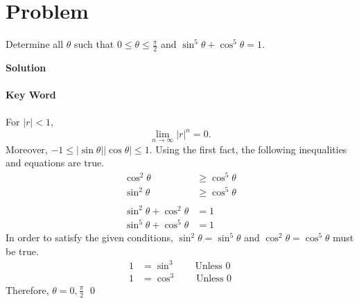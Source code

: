 \documentclass{article}
\newenvironment{solution}{\begin{trivlist}\item[]{\bf Solution}}{\qed \end{trivlist}}
\begin{document}
\newpage
\section*{Problem}
Determine all $\theta$ such that $0 \le \theta \le \frac{\pi}{2}$ and $\sin^5\theta + \cos^5\theta = 1$.
\begin{solution}
\\\\
\textbf{Key Word}
\\\\
For $|r| < 1$, 
\[
\lim_{n \rightarrow \infty}{|r|^n} = 0.
\]
Moreover, $-1 \le |\sin\theta||\cos\theta| \le 1$. Using the first fact, the following inequalities and equations are true.
\begin{align*}
\cos^2\theta &\ge \cos^5\theta \\
\sin^2\theta &\ge \cos^5\theta
\\\\
\sin^2\theta + \cos^2\theta &= 1 \\
\sin^5\theta + \cos^5\theta &= 1
\end{align*}
In order to satisfy the given conditions, $\sin^2\theta = \sin^5\theta$ and $\cos^2\theta = \cos^5\theta$ must be true.
\begin{align*}
    1 &= \sin^3 \qquad \text{Unless 0} \\
    1 &= \cos^3 \qquad \text{Unless 0}
\end{align*}
Therefore, $\theta = \boxed{0, \frac{\pi}{2}}$
\end{solution}
\end{document}
